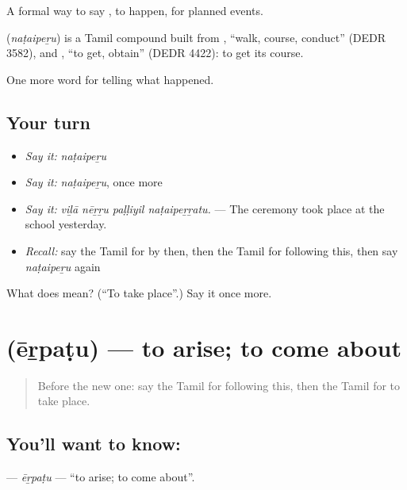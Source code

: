 A formal way to say , to happen, for planned events.

\begin{cousinweb}
\textbf{} (\emph{naṭaipeṟu}) is a Tamil compound built from , \textquotedblleft{}walk, course, conduct\textquotedblright{} (DEDR 3582), and , \textquotedblleft{}to get, obtain\textquotedblright{} (DEDR 4422): to get its course.
\end{cousinweb}

\begin{grammarlens}[title={What you've built}]
One more word for telling what happened.
\end{grammarlens}

\subsection*{Your turn}
\begin{itemize}
\raggedright
  \item \emph{Say it:} \emph{naṭaipeṟu}
  \item \emph{Say it:} \emph{naṭaipeṟu}, once more
  \item \emph{Say it:} \emph{viḻā nēṟṟu paḷḷiyil naṭaipeṟṟatu.} — The ceremony took place at the school yesterday.
  \item \emph{Recall:} say the Tamil for by then, then the Tamil for following this, then say \emph{naṭaipeṟu} again
\end{itemize}

\begin{tcolorbox}[breakable,colback=teal!4,colframe=teal!35!black,title={Before you move on}]
What does  mean? (\textquotedblleft{}To take place\textquotedblright{}.) Say it once more.
\end{tcolorbox}
\section[\texorpdfstring{\ta{ஏற்படு} (ēṟpaṭu)}{ஏற்படு (ēṟpaṭu)}]{ (ēṟpaṭu) — to arise; to come about}

\label{lesson:TA-C315-erpatu}



\begin{quote}
Before the new one: say the Tamil for following this, then the Tamil for to take place.
\end{quote}

\subsection*{You'll want to know: }
\textbf{} — \emph{ēṟpaṭu} — \textquotedblleft{}to arise; to come about\textquotedblright{}.

